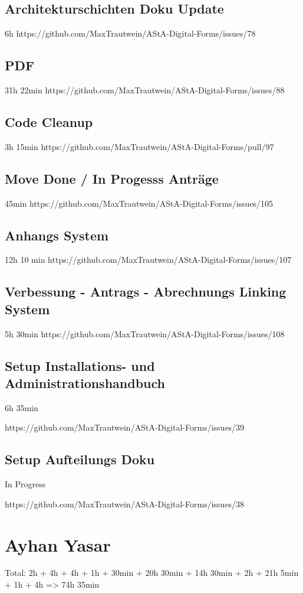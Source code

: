 \subsection{Architekturschichten Doku Update}
6h
https://github.com/MaxTrautwein/AStA-Digital-Forms/issues/78
\subsection{PDF}
31h 22min
https://github.com/MaxTrautwein/AStA-Digital-Forms/issues/88
\subsection{Code Cleanup}
3h 15min
https://github.com/MaxTrautwein/AStA-Digital-Forms/pull/97
\subsection{Move Done / In Progesss Anträge}
45min
https://github.com/MaxTrautwein/AStA-Digital-Forms/issues/105
\subsection{Anhangs System}
12h 10 min
https://github.com/MaxTrautwein/AStA-Digital-Forms/issues/107
\subsection{Verbessung - Antrags - Abrechnungs Linking System}
5h 30min
https://github.com/MaxTrautwein/AStA-Digital-Forms/issues/108
\subsection{Setup Installations- und Administrationshandbuch}
6h 35min

https://github.com/MaxTrautwein/AStA-Digital-Forms/issues/39
\subsection{Setup Aufteilungs Doku}
In Progress

https://github.com/MaxTrautwein/AStA-Digital-Forms/issues/38

\section{Ayhan Yasar}\label{sec:ayhan-yasar}

Total: 2h + 4h + 4h + 1h + 30min + 20h 30min + 14h 30min + 2h + 21h 5min + 1h + 4h
=> 74h 35min

